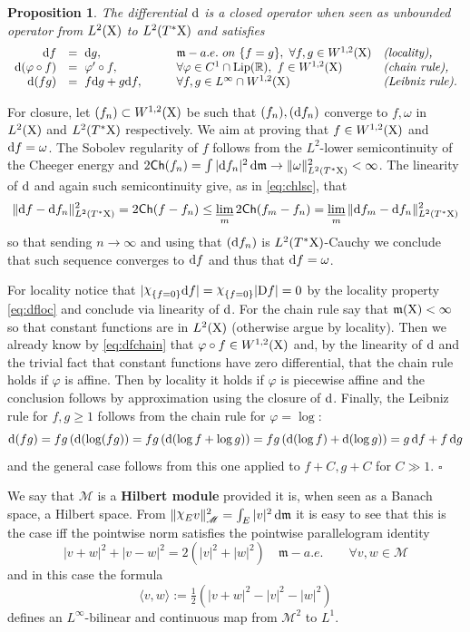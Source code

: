 \documentclass[11pt]{article}
\numberwithin{equation}{section}
\newtheorem{proposition}[theorem]{Proposition}
\newenvironment{idea}{\removelastskip\par\medskip   %
\noindent{\em Idea of the proof} \rm}{\penalty-20\null\hfill$\square$\par\medbreak}
\newcommand{\R}{\mathbb{R}}
\newcommand{\X}{{\rm X}}
\newcommand{\mm}{{\mathfrak m}}
\newcommand{\LIP}{{\rm Lip}}
\newcommand{\ch}{{\sf Ch}}
\renewcommand{\d}{{\rm d}}
\newcommand{\D}{{\rm D}}
\newcommand{\limi}{\varliminf}
\newcommand{\nchi}{{\raise.3ex\hbox{$\chi$}}}
\newcommand\la{\langle}
\newcommand\ra{\rangle}
\newcommand{\M}{\mathscr M}
\begin{document}
\begin{proposition} The differential $\d$ is a closed operator when seen as unbounded operator from $L^2(\X)$ to $L^2(T^*\X)$ and satisfies
\[
\begin{array}{rlll}
\d f&=\ \d g,&\qquad\mm-a.e.\ on\ \{f=g\},\ \forall f,g\in W^{1,2}(\X)&\text{\emph {(locality),}}\\
\d(\varphi\circ f)&=\ \varphi'\circ f,&\qquad\forall\varphi\in C^1\cap\LIP(\R),\ f\in W^{1,2}(\X)&\text{\emph{(chain rule),}}\\
\d(fg)&=\ f\d g+g\d f,&\qquad\forall f,g\in L^\infty\cap W^{1,2}(\X)&\text{\emph{(Leibniz rule).}}\\
\end{array}
\]
\end{proposition}
\begin{idea} For closure, let $(f_n)\subset  W^{1,2}(\X)$ be such that $(f_n),(\d f_n)$ converge to $f,\omega$ in $L^2(\X)$ and $L^2(T^*\X)$ respectively. We aim at proving that $f\in W^{1,2}(\X)$ and $\d f=\omega$. The Sobolev regularity of $f$ follows from the $L^2$-lower semicontinuity of the Cheeger energy and  $2\ch(f_n)=\int|\d f_n|^2\,\d\mm\to \|\omega\|_{L^2(T^*\X)}^2<\infty$. The linearity of $\d$ and again such semicontinuity give, as in \eqref{eq:chlsc}, that
\[
\|\d f-\d f_n\|^2_{L^2(T^*\X)}=2\ch(f-f_n)\leq\limi_m 2\ch(f_m-f_n)=\limi_m \|\d f_m-\d f_n\|^2_{L^2(T^*\X)}
\]
so that sending $n\to\infty$ and using that $(\d f_n)$ is $L^2(T^*\X)$-Cauchy we conclude that such sequence converges to $\d f$ and thus that $\d f=\omega$.

For locality notice that $|\nchi_{\{f=0\}}\d f|=\nchi_{\{f=0\}}|\D f|=0$ by the locality property \eqref{eq:dfloc} and conclude via linearity of $\d$. For the chain rule say that $\mm(\X)<\infty$ so that constant functions are in $L^2(\X)$ (otherwise argue by locality). Then we already know by \eqref{eq:dfchain} that $\varphi\circ f\in W^{1,2}(\X)$ and, by the linearity of $\d$ and the trivial fact that constant functions have zero differential, that the chain rule holds if $\varphi$ is affine. Then by locality it holds if $\varphi$ is piecewise affine and the conclusion follows by approximation using the closure of $\d$. Finally, the Leibniz rule for $f,g\geq 1$ follows from the chain rule for $\varphi=\log$:
\[
\d(fg) =fg\,(\d(\log(fg))=fg\,(\d(\log f+\log g))=fg\,(\d(\log f)+\d (\log g))=g\,\d f+f\,\d g
\]
and the general case follows from this one applied to $f+C,g+C$ for $C\gg1$.
\end{idea}
We say that $\M$ is a {\bf Hilbert module} provided it is, when seen as a Banach space, a Hilbert space. From $\|\nchi_Ev\|^2_\M=\int_E|v|^2\,\d\mm$ it is easy to see that this is the case iff the pointwise norm satisfies the pointwise parallelogram identity
\[
|v+w|^2+|v-w|^2=2(|v|^2+|w|^2)\quad\mm-a.e.\qquad\forall v,w\in\M
\]
and in this case the formula
\[
\la v,w\ra:=\tfrac12(|v+w|^2-|v|^2-|w|^2)
\]
defines an $L^\infty$-bilinear and continuous map from $\M^2$ to $L^1$. 
\end{document}
